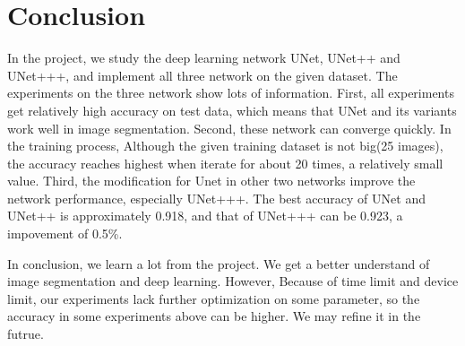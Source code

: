 \section{Conclusion}
In the project, we study the deep learning network UNet, UNet++ and UNet+++, and implement all three network on the given dataset.
The experiments on the three network show lots of information. First, all experiments get relatively high accuracy on test data, which means that UNet and its variants work well in image segmentation.
Second, these network can converge quickly. In the training process, Although the given training dataset is not big(25 images), the accuracy reaches highest when iterate for about 20 times, a relatively small value.
Third, the modification for Unet in other two networks improve the network performance, especially UNet+++. The best accuracy of UNet and UNet++ is approximately 0.918, and that of UNet+++ can be 0.923, a impovement of 0.5\%.

In conclusion, we learn a lot from the project. We get a better understand of image segmentation and deep learning. 
However, Because of time limit and device limit, our experiments lack further optimization on some parameter, so the accuracy in some experiments above can be higher. We may refine it in the futrue.

